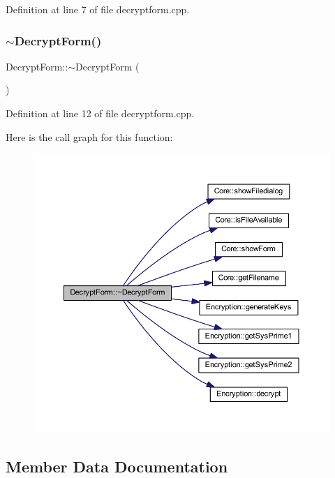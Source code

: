 Definition at line 7 of file decryptform.\+cpp.

\hypertarget{class_decrypt_form_acbf539168ee44015720d6edb380ec4cf}{}\label{class_decrypt_form_acbf539168ee44015720d6edb380ec4cf} 
\subsubsection{\texorpdfstring{$\sim$\+Decrypt\+Form()}{~DecryptForm()}}
{\footnotesize\ttfamily Decrypt\+Form\+::$\sim$\+Decrypt\+Form (\begin{DoxyParamCaption}{ }\end{DoxyParamCaption})}



Definition at line 12 of file decryptform.\+cpp.

Here is the call graph for this function\+:\nopagebreak
\begin{figure}[H]
\begin{center}
\leavevmode
\includegraphics[width=350pt]{class_decrypt_form_acbf539168ee44015720d6edb380ec4cf_cgraph}
\end{center}
\end{figure}


\subsection{Member Data Documentation}
\hypertarget{class_decrypt_form_af0a16237e0a531f3167acd67eae7e69b}{}\label{class_decrypt_form_af0a16237e0a531f3167acd67eae7e69b} 
